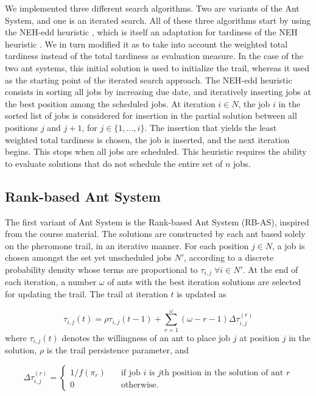 \documentclass[runningheads]{llncs}
\begin{document}
We implemented three different search algorithms. Two are variants of the Ant
System, and one is an iterated search. All of these three algorithms start by
using the NEH-edd heuristic \cite{kim1993new}, which is itself an adaptation for
tardiness of the NEH heuristic \cite{nawaz1983heuristic}. We in turn modified it
as to take into account the weighted total tardiness instead of the total
tardiness as evaluation measure. In the case of the two ant systems, this
initial solution is used to initialize the trail, whereas it used as the
starting point of the iterated search approach. The NEH-edd heuristic consists
in sorting all jobs by increasing due date, and iteratively inserting jobs at
the best position among the scheduled jobs. At iteration $i\in N$, the job $i$
in the sorted list of jobs is considered for insertion in the partial solution
between all positions $j$ and $j+1$, for $j\in\{1,\dots,i\}$. The insertion that
yields the least weighted total tardiness is chosen, the job is inserted, and
the next iteration begins. This stops when all jobs are scheduled. This
heuristic requires the ability to evaluate solutions that do not schedule the
entire set of $n$ jobs.

\subsection{Rank-based Ant System}

The first variant of Ant System is the Rank-based Ant System (RB-AS), inspired
from the course material. The solutions are constructed by each ant based solely
on the pheromone trail, in an iterative manner. For each position $j\in N$, a
job is chosen amongst the set yet unscheduled jobs $N'$, according to a discrete
probability density whose terms are proportional to $\tau_{i,j}\;\forall i\in
N'$. At the end of each iteration, a number $\omega$ of ants with the best
iteration solutions are selected for updating the trail. The trail at iteration
$t$ is updated as

\begin{equation}
	\label{update_rank_based}
	\tau_{i,j}(t)=\rho\tau_{i,j}(t-1)+\sum_{r=1}^\omega(\omega-r-1)\Delta\tau_{i,j}^{(r)}
\end{equation}
where $\tau_{i,j}(t)$ denotes the willingness of an ant to place job $j$ at position
$j$ in the solution, $\rho$ is the trail persistence parameter, and

\begin{equation}
	\Delta\tau_{i,j}^{(r)}=
		\begin{cases}
			1/f(\pi_r)\quad&\text{if job }i\text{ is }j\text{th position in the solution of ant } r\\
			0 \quad&\text{otherwise.}
		\end{cases}
\end{equation}
\end{document}
